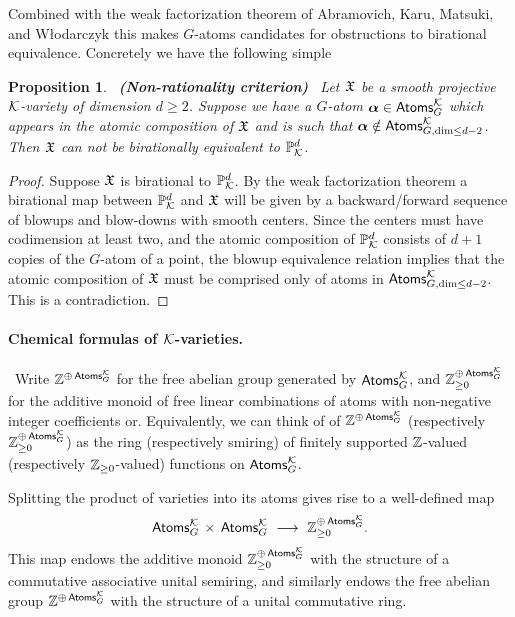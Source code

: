\documentclass[twoside,leqno]{article}
\numberwithin{equation}{section}
\theoremstyle{plain}
\newtheorem{proposition}[equation]{Proposition}
\theoremstyle{definition}
\begin{document}
Combined with the weak factorization theorem of Abramovich, Karu, Matsuki, and W\l{}odarczyk  \cite{Wlodarczyk_factorization,Abramovich_Torification_and_factorization} this makes $G$-atoms candidates for obstructions to birational equivalence.
Concretely we have the following simple

\begin{proposition} \ {\bfseries (Non-rationality criterion) } \ \label{prop:Gnon-rational}
Let $\mathfrak X$ be a smooth projective $\mathcal K$-variety of dimension $d \geq 2$. Suppose we have a $G$-atom $\boldsymbol{\alpha} \in \mathsf{Atoms}_{G}^{\mathcal K}$ which appears in the atomic composition of $\mathfrak X$ and is such that $\boldsymbol{\alpha} \notin \mathsf{Atoms}_{G,\dim \leq d-2}^{\mathcal K}$. Then $\mathfrak X$ can not be birationally equivalent to $\mathbb P^{d}_{\mathcal K}$.
\end{proposition}
\begin{proof} Suppose $\mathfrak X$ is birational to $\mathbb P^{d}_{\mathcal K}$. By the weak factorization theorem 
\cite{Wlodarczyk_factorization,Abramovich_Torification_and_factorization} a birational  map between $\mathbb P^{d}_{\mathcal K}$ and $\mathfrak X$ will be given by a backward/forward sequence of blowups and blow-downs with smooth centers. Since the centers must have codimension at least two, and the  atomic composition of $\mathbb P^{d}_{\mathcal K}$ consists of $d+1$ copies of the $G$-atom of a point, the blowup equivalence relation implies  that the atomic composition of $\mathfrak X$ must be comprised only of atoms in $\mathsf{Atoms}_{G,\dim \leq d-2}^{\mathcal K}$. This is a contradiction. 
\end{proof}

\paragraph{Chemical formulas of \texorpdfstring{$\mathcal K$}{K}-varieties.} \label{par:CFkay}
\ Write $\mathbb Z^{\oplus \, \mathsf{Atoms}^{\mathcal K}_{G}}$  for the free abelian group generated by $\mathsf{Atoms}^{\mathcal K}_{G}$, and  $\mathbb Z^{\oplus \, \mathsf{Atoms}^{\mathcal K}_{G}}_{\geq 0}$ for the additive monoid of free linear combinations of atoms with non-negative integer coefficients or. Equivalently,  we can think of 
of $\mathbb Z^{\oplus \, \mathsf{Atoms}^{\mathcal K}_{G}}$ (respectively $\mathbb Z^{\oplus \, \mathsf{Atoms}^{\mathcal K}_{G}}_{\geq 0}$) as the ring (respectively smiring) of finitely  supported $\mathbb Z$-valued (respectively $\mathbb Z_{\geq 0}$-valued) functions on $\mathsf{Atoms}^{\mathcal K}_{G}$.


Splitting the  product of varieties into its atoms gives rise to a 
well-defined map
\[
\mathsf{Atoms}^{\mathcal K}_{G} \, \times \, \mathsf{Atoms}^{\mathcal K}_{G} \  
\longrightarrow  \ \mathbb Z^{\oplus \, \mathsf{Atoms}^{\mathcal K}_{G}}_{\ge 0}.
\]
This map endows the additive  monoid 
$\mathbb Z^{\oplus \, \mathsf{Atoms}^{\mathcal K}_{G}}_{\ge 0}$
with the structure of a commutative associative unital semiring, and similarly endows the free abelian group 
$\mathbb Z^{\oplus \, \mathsf{Atoms}^{\mathcal K}_{G}}$
with the structure of a unital commutative ring.
\end{document}
